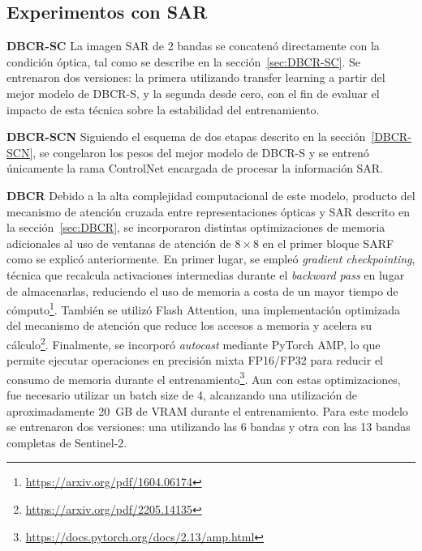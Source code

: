 \subsection{Experimentos con SAR}

\textbf{DBCR-SC} La imagen SAR de 2 bandas se concatenó directamente con la condición óptica, tal como se describe en la sección~\ref{sec:DBCR-SC}.  Se entrenaron dos versiones: la primera utilizando transfer learning a partir del mejor modelo de DBCR-S, y la segunda desde cero, con el fin de evaluar el impacto de esta técnica sobre la estabilidad del entrenamiento.

\textbf{DBCR-SCN} Siguiendo el esquema de dos etapas descrito en la sección~\ref{DBCR-SCN}, se congelaron los pesos del mejor modelo de DBCR-S y se entrenó únicamente la rama ControlNet encargada de procesar la información SAR.

\textbf{DBCR} Debido a la alta complejidad computacional de este modelo, producto del mecanismo de atención cruzada entre representaciones ópticas y SAR descrito en la sección~\ref{sec:DBCR}, se incorporaron distintas optimizaciones de memoria adicionales al uso de ventanas de atención de $8 \times 8$ en el primer bloque SARF como se explicó anteriormente. En primer lugar, se empleó \textit{gradient checkpointing}, técnica que recalcula activaciones intermedias durante el \textit{backward pass} en lugar de almacenarlas, reduciendo el uso de memoria a costa de un mayor tiempo de cómputo\footnote{\url{https://arxiv.org/pdf/1604.06174}}. También se utilizó Flash Attention, una implementación optimizada del mecanismo de atención que reduce los accesos a memoria y acelera su cálculo\footnote{\url{https://arxiv.org/pdf/2205.14135}}. Finalmente, se incorporó \textit{autocast} mediante PyTorch AMP, lo que permite ejecutar operaciones en precisión mixta FP16/FP32 para reducir el consumo de memoria durante el entrenamiento\footnote{\url{https://docs.pytorch.org/docs/2.13/amp.html}}.
Aun con estas optimizaciones, fue necesario utilizar un batch size de 4, alcanzando una utilización de aproximadamente 20~GB de VRAM durante el entrenamiento. Para este modelo se entrenaron dos versiones: una utilizando las 6 bandas y otra con las 13 bandas completas de Sentinel-2.